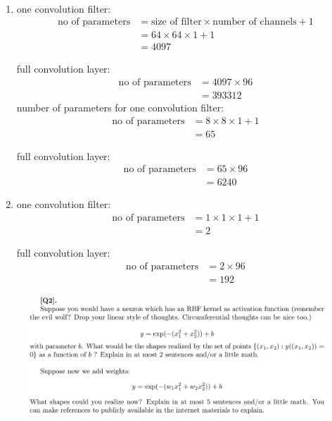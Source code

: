 \documentclass[12pt]{article}
\newenvironment{solution}[2][Solution]{\begin{trivlist}
\item[\hskip \labelsep {\bfseries #1}]}{\end{trivlist}}
\begin{document}
\begin{solution}{}~
\begin{enumerate}
\item one convolution filter:\\
\begin{align*}
\text{no of parameters}&=\text{size of filter}\times\text{number of channels}+1\\
&=64\times64\times1+1\\
&=4097
\end{align*}

full convolution layer:\\
\begin{align*}
\text{no of parameters}&=4097\times96\\
&=393312
\end{align*}
number of parameters for one convolution filter:\\
\begin{align*}
\text{no of parameters}&=8\times8\times1+1\\
&=65
\end{align*}

full convolution layer:\\
\begin{align*}
\text{no of parameters}&=65\times96\\
&=6240
\end{align*}
\item one convolution filter:\\
\begin{align*}
\text{no of parameters}&=1\times1\times1+1\\
&=2
\end{align*}

full convolution layer:\\
\begin{align*}
\text{no of parameters}&=2\times96\\
&=192
\end{align*}
\end{enumerate}
\end{solution}

\begin{figure}[h!]
\includegraphics[width=\linewidth]{./assets/201806161635.png}
\end{figure}
\end{document}
